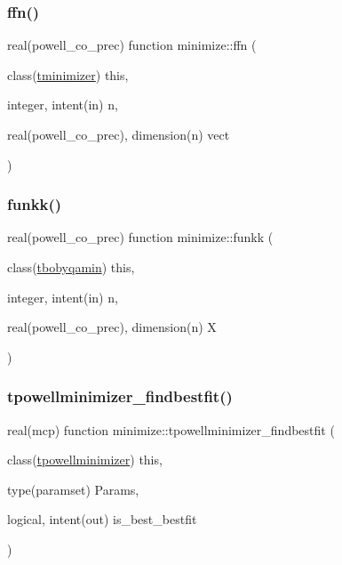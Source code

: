 \subsubsection{\texorpdfstring{ffn()}{ffn()}}
{\footnotesize\ttfamily real(powell\+\_\+co\+\_\+prec) function minimize\+::ffn (\begin{DoxyParamCaption}\item[{class(\mbox{\hyperlink{structminimize_1_1tminimizer}{tminimizer}})}]{this,  }\item[{integer, intent(in)}]{n,  }\item[{real(powell\+\_\+co\+\_\+prec), dimension(n)}]{vect }\end{DoxyParamCaption})\hspace{0.3cm}{\ttfamily [private]}}

\mbox{\label{namespaceminimize_af3ef2c6576f50826eb90dd328260fa29}} 
\subsubsection{\texorpdfstring{funkk()}{funkk()}}
{\footnotesize\ttfamily real(powell\+\_\+co\+\_\+prec) function minimize\+::funkk (\begin{DoxyParamCaption}\item[{class(\mbox{\hyperlink{structminimize_1_1tbobyqamin}{tbobyqamin}})}]{this,  }\item[{integer, intent(in)}]{n,  }\item[{real(powell\+\_\+co\+\_\+prec), dimension(n)}]{X }\end{DoxyParamCaption})\hspace{0.3cm}{\ttfamily [private]}}

\mbox{\label{namespaceminimize_a203054a48736df092e62d1deffc3178d}} 
\subsubsection{\texorpdfstring{tpowellminimizer\+\_\+findbestfit()}{tpowellminimizer\_findbestfit()}}
{\footnotesize\ttfamily real(mcp) function minimize\+::tpowellminimizer\+\_\+findbestfit (\begin{DoxyParamCaption}\item[{class(\mbox{\hyperlink{structminimize_1_1tpowellminimizer}{tpowellminimizer}})}]{this,  }\item[{type(paramset)}]{Params,  }\item[{logical, intent(out)}]{is\+\_\+best\+\_\+bestfit }\end{DoxyParamCaption})\hspace{0.3cm}{\ttfamily [private]}}

